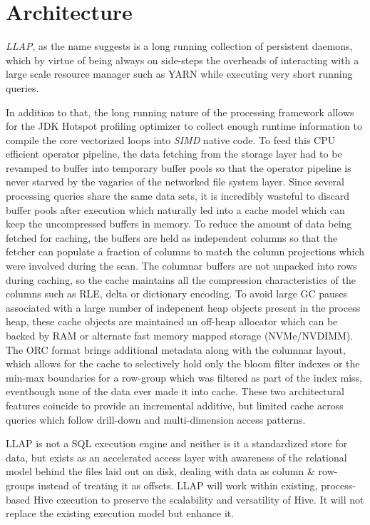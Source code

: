 \section{Architecture}


\emph{LLAP}, as the name suggests is a long running collection of persistent daemons, which by virtue of being always on side-steps the
overheads of interacting with a large scale resource manager such as YARN\cite{YARN} while executing very short running queries. 

In addition to
that, the long running nature of the processing framework allows for the JDK Hotspot profiling optimizer to collect enough runtime information
to compile the core vectorized loops into \emph{SIMD} native code. To feed this CPU efficient operator pipeline, the data fetching from the storage layer
had to be revamped to buffer into temporary buffer pools so that the operator pipeline is never starved by the vagaries of the networked file
system layer. Since several processing queries share the same data sets, it is incredibly wasteful to discard buffer pools after execution which
naturally led into a cache model which can keep the uncompressed buffers in memory. To reduce the amount of data being fetched for caching, the 
buffers are held as independent columns so that the fetcher can populate a fraction of columns to match the column projections which were involved
during the scan.  The columnar buffers are not unpacked into rows during caching, so the cache maintains all the compression characteristics of the columns such 
as RLE, delta or dictionary encoding. To avoid large GC pauses associated with a large number of indepenent heap objects present in the process heap, 
these cache objects are maintained an off-heap allocator which can be backed by RAM or alternate fast memory mapped storage (NVMe/NVDIMM). The ORC format brings 
additional metadata along  with the columnar layout, which allows for the cache to selectively hold
only the bloom filter indexes or the min-max boundaries for a row-group which was filtered as part of the index miss, eventhough none of the data ever made it
into cache. These two architectural features coincide to provide an incremental additive, but limited cache across queries which follow drill-down and multi-dimension 
access patterns.

LLAP is not a SQL execution engine and neither is it a standardized store for data, but exists as an accelerated access layer with awareness of the relational
model behind the files laid out on disk, dealing with data as column \& row-groups instead of treating it as offsets. LLAP will work within existing, process-based Hive execution to preserve the scalability and versatility of Hive.  It will not replace the existing execution model but enhance it.

